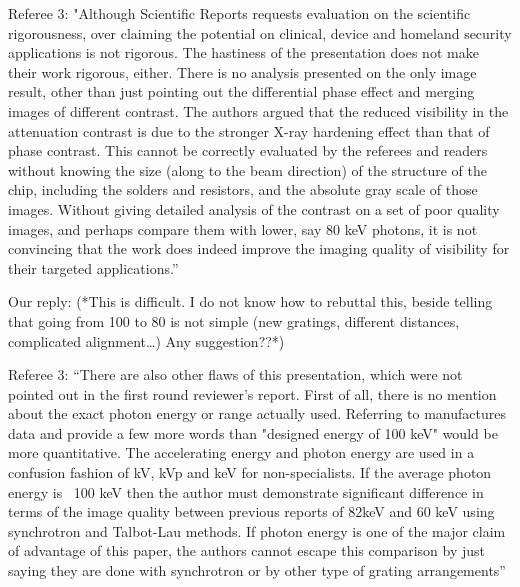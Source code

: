 \documentclass[a4paper,english]{scrartcl} \usepackage[detect-all]{siunitx}
\begin{document}
Referee 3: "Although Scientific Reports requests evaluation on the
scientific rigorousness, over claiming the potential on clinical, device and
homeland security applications is not rigorous. The hastiness of the
presentation does not make their work rigorous, either. There is no analysis
presented on the only image result, other than just pointing out the
differential phase effect and merging images of different contrast. The
authors argued that the reduced visibility in the attenuation contrast is
due to the stronger X-ray hardening effect than that of phase contrast. This
cannot be correctly evaluated by the referees and readers without knowing
the size (along to the beam direction) of the structure of the chip,
including the solders and resistors, and the absolute gray scale of those
images. Without giving detailed analysis of the contrast on a set of poor
quality images, and perhaps compare them with lower, say 80 keV photons, it
is not convincing that the work does indeed improve the imaging quality of
visibility for their targeted applications.”

Our reply: (*This is difficult. I do not know how to rebuttal this, beside
telling that going from 100 to 80 is not simple (new gratings, different
distances, complicated alignment…) Any suggestion??*)

Referee 3: “There are also other flaws of this presentation, which were not
pointed out in the first round reviewer's report. First of all, there is no
mention about the exact photon energy or range actually used. Referring to
manufactures data and provide a few more words than "designed energy of 100
keV" would be more quantitative. The accelerating energy and photon energy
are used in a confusion fashion of kV, kVp and keV for non-specialists. If
the average photon energy is ~100 keV then the author must demonstrate
significant difference in terms of the image quality between previous
reports of 82keV and 60 keV using synchrotron and Talbot-Lau methods. If
photon energy is one of the major claim of advantage of this paper, the
authors cannot escape this comparison by just saying they are done with
synchrotron or by other type of grating arrangements”
\end{document}
